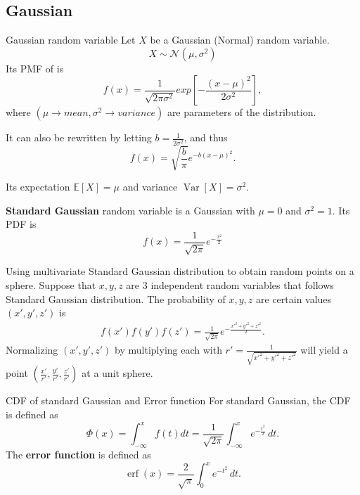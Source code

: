 \documentclass[11pt,a4paper,fleqn]{article}
\numberwithin{equation}{section}
\DeclareMathOperator\Var{\mathrm{Var}}
\DeclareMathOperator\Erf{\ensuremath{\text{erf}}}
\begin{document}
\subsection{Gaussian}

\begin{fact}{Gaussian random variable}{}
    Let $X$ be a Gaussian (Normal) random variable.
    \begin{equation*}
        X \sim \mathcal{N}(\mu,\sigma^2)
    \end{equation*}
    Its PMF of is
    \begin{equation*}
        f(x)=\frac{1}{\sqrt{2\pi\sigma^2}}exp\left[-\frac{(x-\mu)^2}{2\sigma^2}\right],
    \end{equation*}
    where $(\mu\rightarrow mean,\sigma^2\rightarrow variance)$ are parameters of the distribution.
    
    It can also be rewritten by letting $b=\frac{1}{2\sigma^2}$, and thus
    \begin{equation*}
        f(x)=\sqrt{\frac{b}{\pi}}e^{-b(x-\mu)^2}.
    \end{equation*}
    
    Its expectation $\mathbb{E}[X]=\mu$ and variance $\Var[X]=\sigma^2$.
    
    \textbf{Standard Gaussian} random variable is a Gaussian with $\mu=0$ and $\sigma^2=1$. Its PDF is
    \begin{equation*}
        f(x)=\frac{1}{\sqrt{2\pi}}e^{-\frac{x^2}{2}}
    \end{equation*}
\end{fact}

\begin{exec}
    Using multivariate Standard Gaussian distribution to obtain random points on a sphere.
    \tcblower
    Suppose that $x,y,z$ are 3 independent random variables that follows Standard Gaussian distribution.
    The probability of $x,y,z$ are certain values $(x',y',z')$ is
    \begin{align*}
        f(x')f(y')f(z')=\frac{1}{\sqrt{2\pi}}e^{-\frac{x'^2+y'^2+z'^2}{2}}.
    \end{align*}
    Normalizing $(x',y',z')$ by multiplying each with $r'=\frac{1}{\sqrt{x'^2+y'^2+z'^2}}$ will yield a point $(\frac{x'}{r'},\frac{y'}{r'},\frac{z'}{r'})$ at a unit sphere.
\end{exec}

\begin{fact}{CDF of standard Gaussian and Error function}{}
    For standard Gaussian, the CDF is defined as
    \begin{equation*}
        \Phi(x)=\int_{-\infty}^{x}f(t)dt=\frac{1}{\sqrt{2\pi}}\int_{-\infty}^{x} e^{-\frac{t^2}{2}}\,dt.
    \end{equation*}
    The \textbf{error function} is defined as
    \begin{equation*}
        \Erf (x)=\frac{2}{\sqrt{\pi}}\int_{0}^{x}e^{-t^2}\,dt.
    \end{equation*}
\end{fact}
\end{document}
